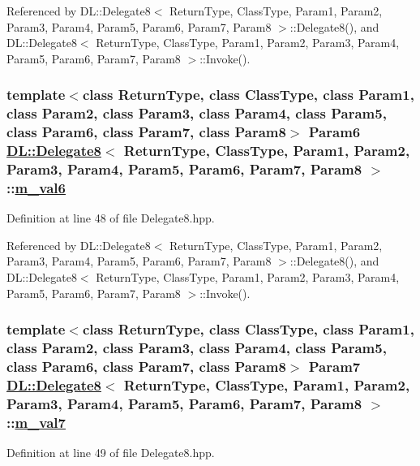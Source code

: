 Referenced by DL::Delegate8$<$ Return\-Type, Class\-Type, Param1, Param2, Param3, Param4, Param5, Param6, Param7, Param8 $>$::Delegate8(), and DL::Delegate8$<$ Return\-Type, Class\-Type, Param1, Param2, Param3, Param4, Param5, Param6, Param7, Param8 $>$::Invoke().\hypertarget{classDL_1_1Delegate8_r7}{
\subsubsection[m\_\-val6]{\setlength{\rightskip}{0pt plus 5cm}template$<$class Return\-Type, class Class\-Type, class Param1, class Param2, class Param3, class Param4, class Param5, class Param6, class Param7, class Param8$>$ Param6 \hyperlink{classDL_1_1Delegate8}{DL::Delegate8}$<$ Return\-Type, Class\-Type, Param1, Param2, Param3, Param4, Param5, Param6, Param7, Param8 $>$::\hyperlink{classDL_1_1Delegate8_r7}{m\_\-val6}}}
\label{classDL_1_1Delegate8_r7}




Definition at line 48 of file Delegate8.hpp.

Referenced by DL::Delegate8$<$ Return\-Type, Class\-Type, Param1, Param2, Param3, Param4, Param5, Param6, Param7, Param8 $>$::Delegate8(), and DL::Delegate8$<$ Return\-Type, Class\-Type, Param1, Param2, Param3, Param4, Param5, Param6, Param7, Param8 $>$::Invoke().\hypertarget{classDL_1_1Delegate8_r8}{
\subsubsection[m\_\-val7]{\setlength{\rightskip}{0pt plus 5cm}template$<$class Return\-Type, class Class\-Type, class Param1, class Param2, class Param3, class Param4, class Param5, class Param6, class Param7, class Param8$>$ Param7 \hyperlink{classDL_1_1Delegate8}{DL::Delegate8}$<$ Return\-Type, Class\-Type, Param1, Param2, Param3, Param4, Param5, Param6, Param7, Param8 $>$::\hyperlink{classDL_1_1Delegate8_r8}{m\_\-val7}}}
\label{classDL_1_1Delegate8_r8}




Definition at line 49 of file Delegate8.hpp.

